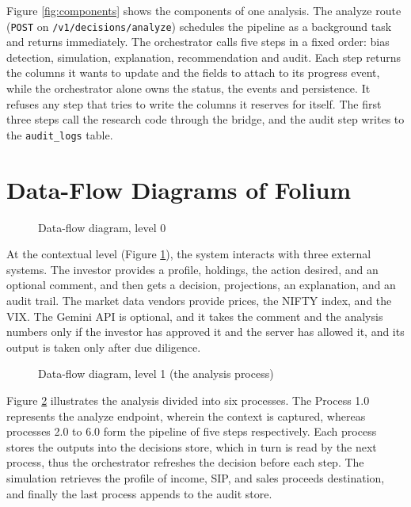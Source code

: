 Figure \ref{fig:components} shows the components of one analysis. The analyze route (\texttt{POST} on \texttt{/v1/decisions/analyze}) schedules the pipeline as a background task and returns immediately. The orchestrator calls five steps in a fixed order: bias detection, simulation, explanation, recommendation and audit. Each step returns the columns it wants to update and the fields to attach to its progress event, while the orchestrator alone owns the status, the events and persistence. It refuses any step that tries to write the columns it reserves for itself. The first three steps call the research code through the bridge, and the audit step writes to the \texttt{audit\_logs} table.

\section{Data-Flow Diagrams of Folium}
\begin{figure}[H]
\centering
\resizebox{0.9\textwidth}{!}{}
\caption{Data-flow diagram, level 0}
\label{fig:dfd0}
\end{figure}

At the contextual level (Figure \ref{fig:dfd0}), the system interacts with three external systems. The investor provides a profile, holdings, the action desired, and an optional comment, and then gets a decision, projections, an explanation, and an audit trail. The market data vendors provide prices, the NIFTY index, and the VIX. The Gemini API is optional, and it takes the comment and the analysis numbers only if the investor has approved it and the server has allowed it, and its output is taken only after due diligence.

\begin{figure}[H]
\centering
\resizebox{0.95\textwidth}{!}{}
\caption{Data-flow diagram, level 1 (the analysis process)}
\label{fig:dfd1}
\end{figure}

Figure \ref{fig:dfd1} illustrates the analysis divided into six processes. The Process 1.0 represents the analyze endpoint, wherein the context is captured, whereas processes 2.0 to 6.0 form the pipeline of five steps respectively. Each process stores the outputs into the decisions store, which in turn is read by the next process, thus the orchestrator refreshes the decision before each step. The simulation retrieves the profile of income, SIP, and sales proceeds destination, and finally the last process appends to the audit store.

